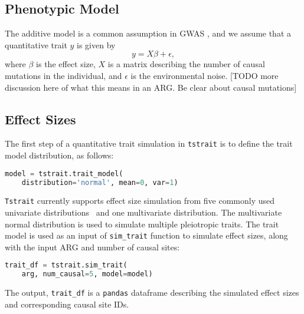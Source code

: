 \documentclass[unnumsec,webpdf,modern,large,namedate]{oup-authoring-template}%
\begin{document}
\subsection{Phenotypic Model}
The additive model is a common assumption in GWAS
\citep{uffelmann2021}, and we assume that a quantitative trait $y$
is given by
\[
y=X\beta+\epsilon,
\]
where $\beta$ is the effect size, $X$ is a matrix describing the number
of causal mutations in the individual, and $\epsilon$ is the environmental
noise.
[TODO more discussion here of what this means in an ARG. Be clear about
causal mutations]

\subsection{Effect Sizes}
The first step of a quantitative trait simulation in \texttt{tstrait} is to
define the trait model distribution, as follows:
\begin{lstlisting}[language=Python]
model = tstrait.trait_model(
    distribution='normal', mean=0, var=1)
\end{lstlisting}
\texttt{Tstrait} currently supports effect size simulation from five
commonly used univariate distributions~\citep{gaynor2021,haller2023}
and one multivariate distribution.
The multivariate normal distribution is used to simulate multiple
pleiotropic traits.
The trait model is used as an input of \texttt{sim\_trait} function to simulate
effect sizes, along with the input ARG and number of causal sites:
\begin{lstlisting}[language=Python]
trait_df = tstrait.sim_trait(
    arg, num_causal=5, model=model)
\end{lstlisting}
The output, \texttt{trait\_df} is a \texttt{pandas} dataframe
describing the simulated effect sizes and corresponding
causal site IDs.
\end{document}

